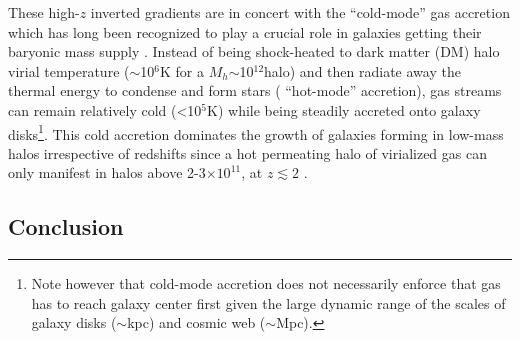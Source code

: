 These high-$z$ inverted gradients are in concert with the ``cold-mode'' gas accretion which has long been recognized to play a
crucial role in galaxies getting their baryonic mass supply
\citep{Birnboim:2003fo,Keres:2005gb,Dekel:2006cn,Dekel:2009fz,2009MNRAS.395..160K}.
Instead of being shock-heated to dark matter (DM) halo virial temperature ($\sim$10$^6$K for a $M_{
h}$$\sim$10$^{12}$\Msun halo) and then radiate away the thermal energy to condense and form stars (\vsv 
``hot-mode'' accretion),
gas streams can remain relatively cold (<10$^5$K) while being steadily accreted onto galaxy 
disks\footnote{Note however that
cold-mode accretion does not necessarily enforce that gas has to reach galaxy center first
given the large dynamic range of the scales of galaxy disks ($\sim$kpc) and cosmic web ($\sim$Mpc).}.
This cold accretion dominates the growth of galaxies forming in low-mass halos irrespective of redshifts since a hot permeating
halo of virialized gas can only manifest in halos above 2-3$\times10^{11}$\Msun, at $z\lesssim2$
\citep{Birnboim:2003fo,Keres:2005gb}.

\subsection{Conclusion}

